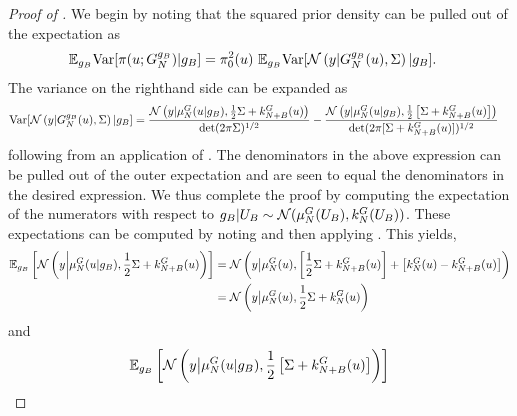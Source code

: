 \documentclass[12pt]{article}
\begin{document}
\begin{proof} [Proof of ]
We begin by noting that the squared prior density can be pulled out of the expectation as
\begin{align*}
\E_{\designBatchFwd} \Var[\postDens(\Par; \fwdEmCond{\designBatchFwd}) | \designBatchFwd]
&= \priorDens^2(\Par) \ \E_{\designBatchFwd}  \Var[\Gaussian\left(\obs |  \fwdEmCond{\designBatchFwd}(\Par), \likPar \right) | \designBatchFwd]. 
\end{align*}
The variance on the righthand side can be expanded as 
\begin{align}
\Var[\Gaussian\left(\obs |  \fwdEmCond{\designBatchFwd}(\Par), \likPar \right) | \designBatchFwd]
&= \frac{\Gaussian\left(\obs | \emMean[\Ndesign]{\fwd}(\Par|\designBatchFwd), \frac{1}{2}\likPar + \emKer[\Naugment]{\fwd}(\Par) \right)}{\det(2\pi \likPar)^{1/2}}
- \frac{\Gaussian\left(\obs | \emMean[\Ndesign]{\fwd}(\Par|\designBatchFwd), \frac{1}{2}\left[\likPar + \emKer[\Naugment]{\fwd}(\Par)\right]  \right)}{\det(2\pi [\likPar + \emKer[\Naugment]{\fwd}(\Par)])^{1/2}}
\end{align}
following from an application of . The denominators in the above expression can be 
pulled out of the outer expectation and are seen to equal the denominators in the desired expression. We thus complete the proof by 
computing the expectation of the numerators with respect to 
$\designBatchFwd | \designBatchIn \sim \Gaussian(\emMean[\Ndesign]{\fwd}(\designBatchIn), \emKer[\Ndesign]{\fwd}(\designBatchIn))$. 
These expectations can be computed by noting  and then applying .
This yields,
\begin{align*}
\E_{\designBatchFwd}\left[\Gaussian\left(\obs \bigg| \emMean[\Ndesign]{\fwd}(\Par|\designBatchFwd), \frac{1}{2}\likPar + \emKer[\Naugment]{\fwd}(\Par) \right)\right]
&= \Gaussian\left(\obs \big| \emMean[\Ndesign]{\fwd}(\Par), 
\left[\frac{1}{2}\likPar + \emKer[\Naugment]{\fwd}(\Par)\right] + \left[\emKer[\Ndesign]{\fwd}(\Par) - \emKer[\Naugment]{\fwd}(\Par)\right] \right) \\
&= \Gaussian\left(\obs \big| \emMean[\Ndesign]{\fwd}(\Par), \frac{1}{2}\likPar + \emKer[\Ndesign]{\fwd}(\Par) \right)
\end{align*}
and
\begin{align*}
\E_{\designBatchFwd}\left[\Gaussian\left(\obs \big| \emMean[\Ndesign]{\fwd}(\Par|\designBatchFwd), \frac{1}{2}\left[\likPar + \emKer[\Naugment]{\fwd}(\Par)\right]\right)\right] 

\end{align*}
\end{proof}
\end{document}
